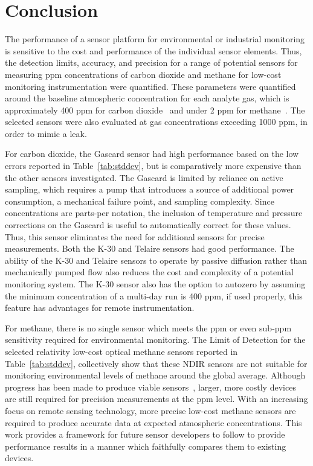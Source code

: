 \documentclass[sensors,article,submit,moreauthors,pdftex]{Definitions/mdpi}
\begin{document}
			
			\FloatBarrier	
	
	\section{Conclusion}
	
		The performance of a sensor platform for environmental or industrial monitoring is sensitive to the cost and performance of the individual sensor elements.
			Thus, the detection limits, accuracy, and precision for a range of potential sensors for measuring ppm concentrations of carbon dioxide and methane for low-cost monitoring instrumentation were quantified.
			These parameters were quantified around the baseline atmospheric concentration for each analyte gas, which is approximately 400 ppm for carbon dioxide~\cite{blasing_recent_2016,dlugokencky_trends_2016} and under 2 ppm for methane~\cite{turner_large_2016,bamberger_spatial_2014,dlugokencky_trends_2016-1}.
			The selected sensors were also evaluated at gas concentrations exceeding 1000 ppm, in order to mimic a leak.
			
		
		For carbon dioxide, the Gascard sensor had high performance based on the low errors reported in Table~\ref{tab:stddev}, but is comparatively more expensive than the other sensors investigated.
		The Gascard is limited by reliance on active sampling, which requires a pump that introduces a source of additional power consumption, a mechanical failure point, and sampling complexity.
		Since concentrations are parts-per notation, the inclusion of temperature and pressure corrections on the Gascard is useful to automatically correct for these values.
		Thus, this sensor eliminates the need for additional sensors for precise measurements.
		 Both the K-30 and Telaire sensors had good performance.
		The ability of the K-30 and Telaire sensors to operate by passive diffusion rather than mechanically pumped flow also reduces the cost and complexity of a potential monitoring system.
		 The K-30 sensor also has the option to autozero by assuming the minimum concentration of a multi-day run is 400 ppm, if used properly, this feature has advantages for remote instrumentation.
		
		
		For methane, there is no single sensor which meets the ppm or even sub-ppm sensitivity required for environmental monitoring. The Limit of Detection for the selected relativity low-cost optical methane sensors reported in Table~\ref{tab:stddev}, collectively show that these NDIR sensors are not suitable for monitoring environmental levels of methane around the global average.
		Although progress has been made to produce viable sensors~\cite{zhu_one_2012}, larger, more costly devices are still required for precision measurements at the ppm level.
		With an increasing focus on remote sensing technology, more precise low-cost methane sensors are required to produce accurate data at expected atmospheric concentrations.
		This work provides a framework for future sensor developers to follow to provide performance results in a manner which faithfully compares them to existing devices.
		
\end{document}
